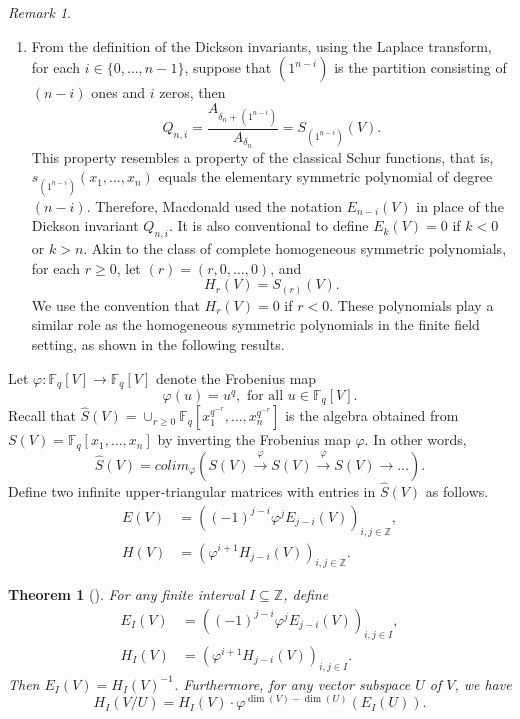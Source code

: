 \documentclass[12pt,a4paper]{report}
\newtheorem{theorem}{Theorem}[chapter]
\theoremstyle{definition}
\theoremstyle{remark}
\newtheorem*{remark}{Remark}
\theoremstyle{definition}
\begin{document}
\begin{remark}
\begin{enumerate}
    \item From the definition of the Dickson invariants, using the Laplace transform, for each $i\in \{0, \ldots, n-1\}$, suppose that $(1^{n-i})$ is the partition consisting of $(n-i)$ ones and $i$ zeros, then
    \begin{equation*}
    Q_{n, i} = \dfrac{A_{\delta_n + (1^{n-i})}}{A_{\delta_n}} = S_{(1^{n-i})}(V).
    \end{equation*}
    This property resembles a property of the classical Schur functions, that is, $s_{(1^{n-i})}(x_1, \ldots, x_n)$ equals the elementary symmetric polynomial of degree $(n-i)$. Therefore, Macdonald used the notation $E_{n-i}(V)$ in place of the Dickson invariant $Q_{n, i}$. It is also conventional to define $E_k(V) = 0$ if $k<0$ or $k>n$.\smallbreak
    Akin to the class of complete homogeneous symmetric polynomials, for each $r\geq 0$, let $(r) = (r, 0, \ldots, 0)$, and 
    \begin{equation*}
        H_r(V) = S_{(r)}(V).
    \end{equation*}
    We use the convention that $H_r(V) = 0$ if $r<0$. These polynomials play a similar role as the homogeneous symmetric polynomials in the finite field setting, as shown in the following results.
\end{enumerate}
\end{remark}
Let $\varphi: \mathbb{F}_q[V]\to \mathbb{F}_q[V]$ denote the Frobenius map
\begin{equation*}
    \varphi(u) = u^q, \text{ for all } u\in \mathbb{F}_q[V].
\end{equation*}
Recall that $\widehat{S}(V) = \cup_{r \geq 0} \mathbb{F}_q [x_1^{q^{-r}}, \ldots, x_n^{q^{-r}}]$ is the algebra obtained from $S(V) = \mathbb{F}_q [x_1, \ldots, x_n]$ by inverting the Frobenius map $\varphi$. In other words,
\begin{equation*}
\widehat{S}(V) = colim_{\varphi} (S(V) \xrightarrow{\varphi} S(V) \xrightarrow{\varphi} S(V) \xrightarrow{} \ldots ).    
\end{equation*}
Define two infinite upper-triangular matrices with entries in $\widehat{S}(V)$ as follows.
\begin{align*}
    E(V) &= ((-1)^{j-i}\varphi^j E_{j-i}(V))_{i, j\in \mathbb{Z}},\\
    H(V) & =(\varphi^{i+1} H_{j-i}(V))_{i, j\in \mathbb{Z}}.
\end{align*}
\begin{theorem}[{\cite[(7.9) and (7.17)]{macdonald_schur_1992}}]\label{thm:H_is_E_inverse}
    For any finite interval $I\subseteq \mathbb{Z}$, define
    \begin{align*}
    E_I(V) &= ((-1)^{j-i}\varphi^j E_{j-i}(V))_{i, j\in I},\\
    H_I(V) & =(\varphi^{i+1} H_{j-i}(V))_{i, j\in I}.
\end{align*}
Then $E_I(V) = H_I(V)^{-1}$. Furthermore, for any vector subspace $U$ of $V$, we have
\begin{equation*}
    H_I(V/U) = H_I(V)\cdot \varphi^{\dim(V) - \dim(U)}(E_I(U)).
\end{equation*}
\end{theorem}
\end{document}
